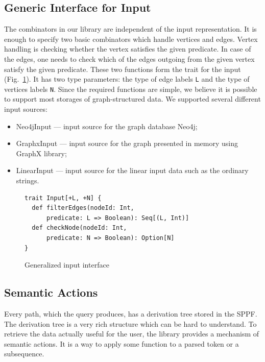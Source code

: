 \subsection{Generic Interface for Input}
The combinators in our library are independent of the input representation.
It is enough to specify two basic combinators which handle vertices and edges.
Vertex handling is checking whether the vertex satisfies the given predicate.
In case of the edges, one needs to check which of the edges outgoing from the given vertex satisfy the given predicate.
These two functions form the trait for the input (Fig.~\ref{fig:input}).
It has two type parameters: the type of edge labels \lstinline{L} and the type of vertices labels \lstinline{N}.
Since the required functions are simple, we believe it is possible to support most storages of graph-structured data.
We supported several different input sources:

\begin{itemize}
    \item Neo4jInput --- input source for the graph database Neo4j;
    \item GraphxInput --- input source for the graph presented in memory using GraphX library;
    \item LinearInput --- input source for the linear input data such as the ordinary strings.
\end{itemize}

\begin{figure}[h]
\begin{lstlisting}
trait Input[+L, +N] {
  def filterEdges(nodeId: Int,
      predicate: L => Boolean): Seq[(L, Int)]
  def checkNode(nodeId: Int,
      predicate: N => Boolean): Option[N]
}

\end{lstlisting}
\caption{Generalized input interface}
\label{fig:input}
\end{figure}

\subsection{Semantic Actions}
\label{sec:semanticActions}

Every path, which the query produces, has a derivation tree stored in the SPPF.
The derivation tree is a very rich structure which can be hard to understand.
To retrieve the data actually useful for the user, the library provides a mechanism of semantic actions.
It is a way to apply some function to a parsed token or a subsequence.

